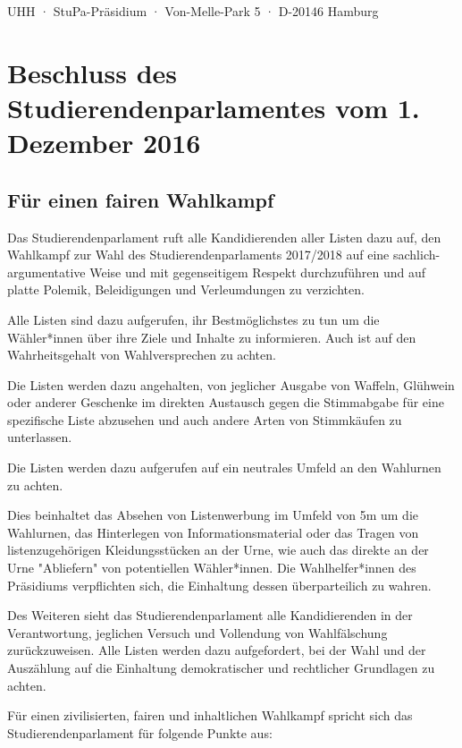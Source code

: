 \documentclass[ngerman,headheight=70pt]{scrartcl}
\begin{document}
    UHH · StuPa-Präsidium · Von-Melle-Park 5 · D-20146 Hamburg

    \section*{Beschluss des Studierendenparlamentes vom 1. Dezember 2016}
    \subsection*{Für einen fairen Wahlkampf}

    Das Studierendenparlament ruft alle Kandidierenden aller Listen dazu auf,
    den Wahlkampf zur Wahl des Studierendenparlaments 2017/2018 auf eine
    sachlich-argumentative Weise und mit gegenseitigem Respekt durchzuführen und
    auf platte Polemik, Beleidigungen und Verleumdungen zu verzichten.

    Alle Listen sind dazu aufgerufen, ihr Bestmöglichstes zu tun um die
    Wähler*innen über ihre Ziele und Inhalte zu informieren. Auch ist auf den
    Wahrheitsgehalt von Wahlversprechen zu achten.

    Die Listen werden dazu angehalten, von jeglicher Ausgabe von Waffeln, Glühwein
    oder anderer Geschenke im direkten Austausch gegen die Stimmabgabe für eine
    spezifische Liste abzusehen und auch andere Arten von Stimmkäufen zu
    unterlassen.

    Die Listen werden dazu aufgerufen auf ein neutrales Umfeld an den Wahlurnen
    zu achten.

    Dies beinhaltet das Absehen von Listenwerbung im Umfeld von 5m um die
    Wahlurnen, das Hinterlegen von Informationsmaterial oder das Tragen von
    listenzugehörigen Kleidungsstücken an der Urne, wie auch das direkte an der
    Urne "Abliefern" von potentiellen Wähler*innen. Die Wahlhelfer*innen des
    Präsidiums verpflichten sich, die Einhaltung dessen überparteilich zu wahren.

    Des Weiteren sieht das Studierendenparlament alle Kandidierenden in der
    Verantwortung, jeglichen Versuch und Vollendung von Wahlfälschung
    zurückzuweisen. Alle Listen werden dazu aufgefordert, bei der Wahl und der
    Auszählung auf die Einhaltung demokratischer und rechtlicher Grundlagen zu
    achten.

    Für einen zivilisierten, fairen und inhaltlichen Wahlkampf spricht sich das
    Studierendenparlament für folgende Punkte aus:
\end{document}
